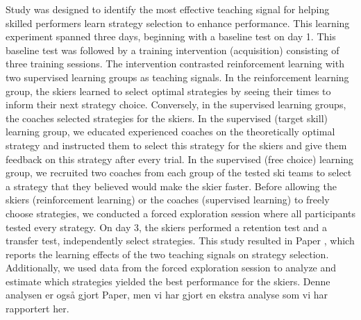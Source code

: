 Study  was designed to identify the most effective teaching signal for helping skilled performers learn strategy selection to enhance performance. This learning experiment spanned three days, beginning with a baseline test on day 1. This baseline test was followed by a training intervention (acquisition) consisting of three training sessions. The intervention contrasted reinforcement learning with two supervised learning groups as teaching signals. In the reinforcement learning group, the skiers learned to select optimal strategies by seeing their times to inform their next strategy choice. Conversely, in the supervised learning groups, the coaches selected strategies for the skiers. In the supervised (target skill) learning group, we educated experienced coaches on the theoretically optimal strategy and instructed them to select this strategy for the skiers and give them feedback on this strategy after every trial. In the supervised (free choice) learning group, we recruited two coaches from each group of the tested ski teams to select a strategy that they believed would make the skier faster. Before allowing the skiers (reinforcement learning) or the coaches (supervised learning) to freely choose strategies, we conducted a forced exploration session where all participants tested every strategy. On day 3, the skiers performed a retention test and a transfer test, independently select strategies. This study resulted in Paper , which reports the learning effects of the two teaching signals on strategy selection. Additionally, we used data from the forced exploration session to analyze and estimate which strategies yielded the best performance for the skiers. Denne analysen er også gjort Paper, men vi har gjort en ekstra analyse som vi har rapportert her. 
